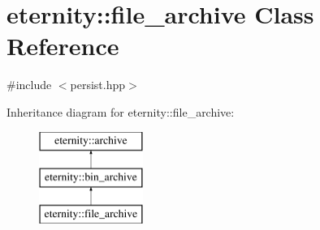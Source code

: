\hypertarget{classeternity_1_1file__archive}{}\section{eternity\+:\+:file\+\_\+archive Class Reference}
\label{classeternity_1_1file__archive}


{\ttfamily \#include $<$persist.\+hpp$>$}

Inheritance diagram for eternity\+:\+:file\+\_\+archive\+:\begin{figure}[H]
\begin{center}
\leavevmode
\includegraphics[height=3.000000cm]{classeternity_1_1file__archive}
\end{center}
\end{figure}
